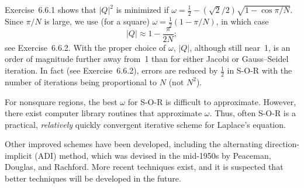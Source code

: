 Exercise~6.6.1 shows that $|Q|^2$ is minimized if $\omega = \frac{1}{2} - (\sqrt{2}/2)\sqrt{1 - \cos\pi/N}$.  Since $\pi/N$ is large, we use (for a square) $\omega = \frac{1}{2}(1 - \pi/N)$, in which case
\[
|Q| \approx 1 - \frac{\pi}{2N};
\]
see Exercise~6.6.2.  With the proper choice of $\omega$, $|Q|$, although still near~1, is an order of magnitude further away from~1 than for either Jacobi or Gauss--Seidel iteration.  In fact (see Exercise~6.6.2), errors are reduced by $\frac{1}{2}$ in S-O-R with the number of iterations being proportional to $N$ (not $N^2$).

For nonsquare regions, the best $\omega$ for S-O-R is difficult to approximate.  However, there exist computer library routines that approximate $\omega$.  Thus, often S-O-R is a practical, \emph{relatively} quickly convergent iterative scheme for Laplace's equation.

Other improved schemes have been developed, including the alternating direction-implicit (ADI) method, which was devised in the mid-1950s by Peaceman, Douglas, and Rachford.  More recent techniques exist, and it is suspected that better techniques will be developed in the future.

